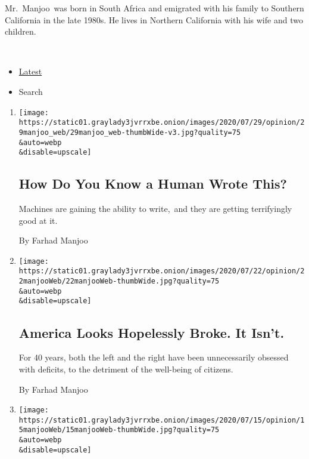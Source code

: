 Mr.~Manjoo~was born in South Africa and emigrated with his family to
Southern California in the late 1980s. He lives in Northern California
with his wife and two children.~

~

\begin{itemize}
\tightlist
\item
  \protect\hyperlink{stream-panel}{Latest}
\item
  Search
\end{itemize}

\begin{enumerate}
\def\labelenumi{\arabic{enumi}.}
\item
  \href{/2020/07/29/opinion/gpt-3-ai-automation.html}{}

  \texttt{[image: https://static01.graylady3jvrrxbe.onion/images/2020/07/29/opinion/29manjoo\_web/29manjoo\_web-thumbWide-v3.jpg?quality=75\\\&auto=webp\\\&disable=upscale]}

  \hypertarget{how-do-you-know-a-human-wrote-this}{%
  \subsection{How Do You Know a Human Wrote
  This?}\label{how-do-you-know-a-human-wrote-this}}

  Machines are gaining the ability to write,~and they are getting
  terrifyingly good at it.

  By Farhad Manjoo
\item
  \href{/2020/07/22/opinion/economy-spending-modern-monetary-theory.html}{}

  \texttt{[image: https://static01.graylady3jvrrxbe.onion/images/2020/07/22/opinion/22manjooWeb/22manjooWeb-thumbWide.jpg?quality=75\\\&auto=webp\\\&disable=upscale]}

  \hypertarget{america-looks-hopelessly-broke-it-isnt}{%
  \subsection{America Looks Hopelessly Broke. It
  Isn't.}\label{america-looks-hopelessly-broke-it-isnt}}

  For 40 years, both the left and the right have been unnecessarily
  obsessed with deficits, to the detriment of the well-being of
  citizens.

  By Farhad Manjoo
\item
  \href{/2020/07/15/opinion/schools-reopening.html}{}

  \texttt{[image: https://static01.graylady3jvrrxbe.onion/images/2020/07/15/opinion/15manjooWeb/15manjooWeb-thumbWide.jpg?quality=75\\\&auto=webp\\\&disable=upscale]}


\end{enumerate}
